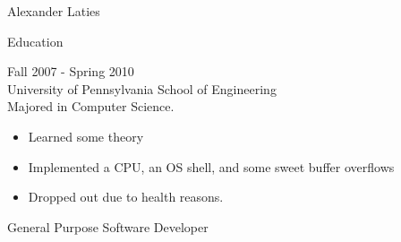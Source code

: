 \documentclass[a4paper]{article}
\begin{document}
    \begin{multicols}{2}
        \begin{LARGE}
        \noindent
        Alexander Laties\\
        \end{LARGE}
        \columnbreak

        \begin{Large}
        \noindent
        Education\\
        \end{Large}
        \begingroup
        \fontsize{8pt}{12pt}\selectfont
        \noindent
        Fall 2007 - Spring 2010 \\
        University of Pennsylvania School of Engineering \\
        Majored in Computer Science.
        \begin{itemize}
            \item Learned some theory 
            \item Implemented a CPU, an OS shell, and some sweet buffer overflows 
            \item Dropped out due to health reasons.
        \end{itemize}
        \endgroup
    \end{multicols}
    

    \begin{Large}
        \noindent
        General Purpose Software Developer \\
    \end{Large}
\end{document}
